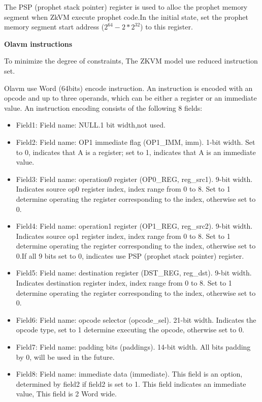 The PSP (prophet stack pointer) register is used to alloc the prophet memory segment when ZkVM execute prophet code.In the initial state, set the prophet memory segment start address ($2^{64} - 2*2^{32}$) to this register.

\textbf{Olavm instructions}

To minimize the degree of constraints, The ZKVM model use reduced instruction set.

Olavm use Word (64bits) encode instruction.
An instruction is encoded with an opcode and up to three operands, which can be either a register or an immediate value.
An instruction encoding consists of the following 8 fields:
\begin{itemize}
    \item Field1: Field name: NULL.1 bit width,not used.
    \item Field2: Field name: OP1 immediate flag (OP1\_IMM, imm). 1-bit width. Set to 0, indicates that A is a register; set to 1, indicates that A is an immediate value.
    \item Field3: Field name: operation0 register (OP0\_REG, reg\_src1). 9-bit width. Indicates source op0 register index, index range from 0 to 8.
                  Set to 1 determine operating the register corresponding to the index, otherwise set to 0.
    \item Field4: Field name: operation1 register (OP1\_REG, reg\_src2). 9-bit width. Indicates source op1 register index, index range from 0 to 8.
                  Set to 1 determine operating the register corresponding to the index, otherwise set to 0.If all 9 bits set to 0, indicates use PSP (prophet stack pointer) register.
    \item Field5: Field name: destination register (DST\_REG, reg\_dst). 9-bit width. Indicates destination register index, index range from 0 to 8.
                  Set to 1 determine operating the register corresponding to the index, otherwise set to 0.
    \item Field6: Field name: opcode selector (opcode\_sel). 21-bit width. Indicates the opcode type, set to 1 determine executing the opcode, otherwise set to 0.
    \item Field7: Field name: padding bits (paddings). 14-bit width.
                  All bits padding by 0, will be used in the future.
    \item Field8: Field name: immediate data (immediate). This field is an option, determined by field2 if field2 is set to 1.
                  This field indicates an immediate value, This field is 2 Word wide.
\end{itemize}

